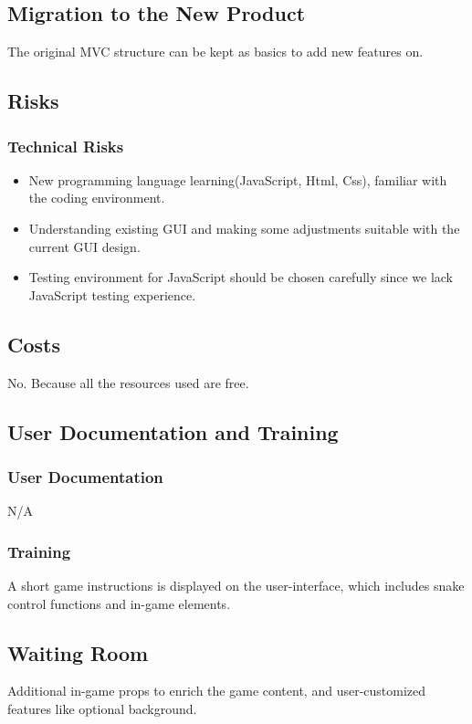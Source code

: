 \documentclass[12pt, titlepage]{article}
\begin{document}
\subsection{Migration to the New Product}
The original MVC structure can be kept as basics to add new features on. 

\subsection{Risks}
\subsubsection{Technical Risks}
\begin{itemize}
    \item New programming language learning(JavaScript, Html, Css), familiar with the coding environment.
    \item Understanding existing GUI and making some adjustments suitable with the current GUI design.
    \item Testing environment for JavaScript should be chosen carefully since we lack JavaScript testing experience.

\end{itemize}

\subsection{Costs}
No. Because all the resources used are free.
\subsection{User Documentation and Training}
\subsubsection{User Documentation}
N/A
\subsubsection{Training}
A short game instructions is displayed on the user-interface, which includes snake control functions and in-game elements.

\subsection{Waiting Room}
Additional in-game props to enrich the game content, and user-customized features like optional background.
\end{document}
